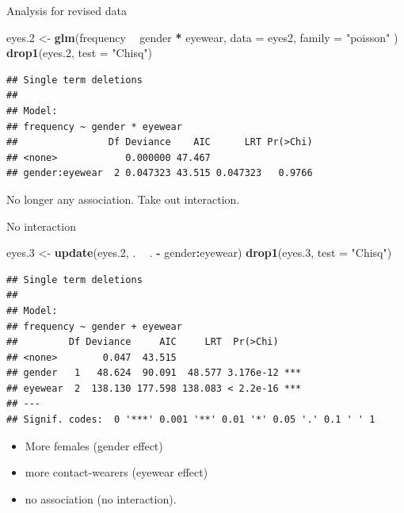 \documentclass[ignorenonframetext,]{beamer}
\newenvironment{Shaded}{\begin{snugshade}}{\end{snugshade}}
\newcommand{\DataTypeTok}[1]{\textcolor[rgb]{0.13,0.29,0.53}{#1}}
\newcommand{\FloatTok}[1]{\textcolor[rgb]{0.00,0.00,0.81}{#1}}
\newcommand{\KeywordTok}[1]{\textcolor[rgb]{0.13,0.29,0.53}{\textbf{#1}}}
\newcommand{\NormalTok}[1]{#1}
\newcommand{\OperatorTok}[1]{\textcolor[rgb]{0.81,0.36,0.00}{\textbf{#1}}}
\newcommand{\StringTok}[1]{\textcolor[rgb]{0.31,0.60,0.02}{#1}}
\begin{document}
\begin{frame}[fragile]{Analysis for revised data}
\protect\hypertarget{analysis-for-revised-data}{}

\begin{Shaded}
\begin{Highlighting}[]
\NormalTok{eyes}\FloatTok{.2}\NormalTok{ <-}\StringTok{ }\KeywordTok{glm}\NormalTok{(frequency }\OperatorTok{~}\StringTok{ }\NormalTok{gender }\OperatorTok{*}\StringTok{ }\NormalTok{eyewear,}
  \DataTypeTok{data =}\NormalTok{ eyes2,}
  \DataTypeTok{family =} \StringTok{"poisson"}
\NormalTok{)}
\KeywordTok{drop1}\NormalTok{(eyes}\FloatTok{.2}\NormalTok{, }\DataTypeTok{test =} \StringTok{"Chisq"}\NormalTok{)}
\end{Highlighting}
\end{Shaded}

\begin{verbatim}
## Single term deletions
## 
## Model:
## frequency ~ gender * eyewear
##                Df Deviance    AIC      LRT Pr(>Chi)
## <none>            0.000000 47.467                  
## gender:eyewear  2 0.047323 43.515 0.047323   0.9766
\end{verbatim}

No longer any association. Take out interaction.

\end{frame}

\begin{frame}[fragile]{No interaction}
\protect\hypertarget{no-interaction}{}

\small

\begin{Shaded}
\begin{Highlighting}[]
\NormalTok{eyes}\FloatTok{.3}\NormalTok{ <-}\StringTok{ }\KeywordTok{update}\NormalTok{(eyes}\FloatTok{.2}\NormalTok{, . }\OperatorTok{~}\StringTok{ }\NormalTok{. }\OperatorTok{-}\StringTok{ }\NormalTok{gender}\OperatorTok{:}\NormalTok{eyewear)}
\KeywordTok{drop1}\NormalTok{(eyes}\FloatTok{.3}\NormalTok{, }\DataTypeTok{test =} \StringTok{"Chisq"}\NormalTok{)}
\end{Highlighting}
\end{Shaded}

\begin{verbatim}
## Single term deletions
## 
## Model:
## frequency ~ gender + eyewear
##         Df Deviance     AIC     LRT  Pr(>Chi)    
## <none>        0.047  43.515                      
## gender   1   48.624  90.091  48.577 3.176e-12 ***
## eyewear  2  138.130 177.598 138.083 < 2.2e-16 ***
## ---
## Signif. codes:  0 '***' 0.001 '**' 0.01 '*' 0.05 '.' 0.1 ' ' 1
\end{verbatim}

\normalsize

\begin{itemize}
\item
  More females (gender effect)
\item
  more contact-wearers (eyewear effect)
\item
  no association (no interaction).
\end{itemize}

\end{frame}
\end{document}
